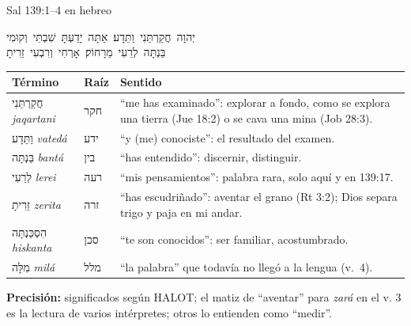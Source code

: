 \documentclass[hyperref={bookmarks=false},aspectratio=169]{beamer}
\newcommand{\heb}[1]{\mbox{\foreignlanguage{hebrew}{#1}}}
\newcommand{\precision}[1]{{\footnotesize\color{gris}\textbf{Precisión:} #1}}
\begin{document}
\begin{frame}{Sal 139:1--4 en hebreo}
\begin{center}
\heb{יְהוָה חֲקַרְתַּנִי וַתֵּדָע׃ אַתָּה יָדַעְתָּ שִׁבְתִּי וְקוּמִי}\\[1pt]
\heb{בַּנְתָּה לְרֵעִי מֵרָחוֹק׃ אָרְחִי וְרִבְעִי זֵרִיתָ}
\end{center}
\renewcommand{\arraystretch}{1.1}\scriptsize
\begin{tabular}{@{}>{\RaggedRight\arraybackslash}p{2.5cm}>{\RaggedRight\arraybackslash}p{1.1cm}>{\RaggedRight\arraybackslash}p{8.3cm}@{}}
\toprule
\textbf{Término} & \textbf{Raíz} & \textbf{Sentido} \\ \midrule
\heb{חֲקַרְתַּנִי} \emph{jaqartani} & \heb{חקר} & ``me has examinado'': explorar a fondo, como se explora una tierra (Jue 18:2) o se cava una mina (Job 28:3). \\
\heb{וַתֵּדָע} \emph{vatedá} & \heb{ידע} & ``y (me) conociste'': el resultado del examen. \\
\heb{בַּנְתָּה} \emph{bantá} & \heb{בין} & ``has entendido'': discernir, distinguir. \\
\heb{לְרֵעִי} \emph{lerei} & \heb{רעה} & ``mis pensamientos'': palabra rara, solo aquí y en 139:17. \\
\heb{זֵרִיתָ} \emph{zerita} & \heb{זרה} & ``has escudriñado'': aventar el grano (Rt 3:2); Dios separa trigo y paja en mi andar. \\
\heb{הִסְכַּנְתָּה} \emph{hiskanta} & \heb{סכן} & ``te son conocidos'': ser familiar, acostumbrado. \\
\heb{מִלָּה} \emph{milá} & \heb{מלל} & ``la palabra'' que todavía no llegó a la lengua (v.~4). \\
\bottomrule
\end{tabular}\par\smallskip
\precision{significados según HALOT; el matiz de ``aventar'' para \emph{zará} en el v. 3 es la lectura de varios intérpretes; otros lo entienden como ``medir''.}
\end{frame}
\end{document}
